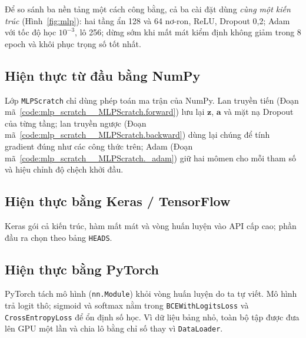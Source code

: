 Để so sánh ba nền tảng một cách công bằng, cả ba cài đặt dùng \emph{cùng một kiến trúc} (Hình~\ref{fig:mlp}): hai tầng ẩn
128 và 64 nơ-ron, ReLU, Dropout 0,2; Adam với tốc độ học $10^{-3}$, lô 256; dừng sớm khi mất mát kiểm định không giảm trong
8 epoch và khôi phục trọng số tốt nhất.


\subsection{Hiện thực từ đầu bằng NumPy}

Lớp \texttt{MLPScratch} chỉ dùng phép toán ma trận của NumPy. Lan truyền tiến (Đoạn mã~\ref{code:mlp_scratch__MLPScratch.forward})
lưu lại $\mathbf{z}$, $\mathbf{a}$ và mặt nạ Dropout của từng tầng; lan truyền ngược
(Đoạn mã~\ref{code:mlp_scratch__MLPScratch.backward}) dùng lại chúng để tính gradient đúng như các công thức trên; Adam
(Đoạn mã~\ref{code:mlp_scratch__MLPScratch._adam}) giữ hai mômen cho mỗi tham số và hiệu chỉnh độ chệch khởi đầu.


\subsection{Hiện thực bằng Keras / TensorFlow}

Keras gói cả kiến trúc, hàm mất mát và vòng huấn luyện vào API cấp cao; phần đầu ra chọn theo bảng \texttt{HEADS}.


\subsection{Hiện thực bằng PyTorch}

PyTorch tách mô hình (\texttt{nn.Module}) khỏi vòng huấn luyện do ta tự viết. Mô hình trả logit thô; sigmoid và softmax
nằm trong \texttt{BCEWithLogitsLoss} và \texttt{CrossEntropyLoss} để ổn định số học. Vì dữ liệu bảng nhỏ, toàn bộ tập
được đưa lên GPU một lần và chia lô bằng chỉ số thay vì \texttt{DataLoader}.

